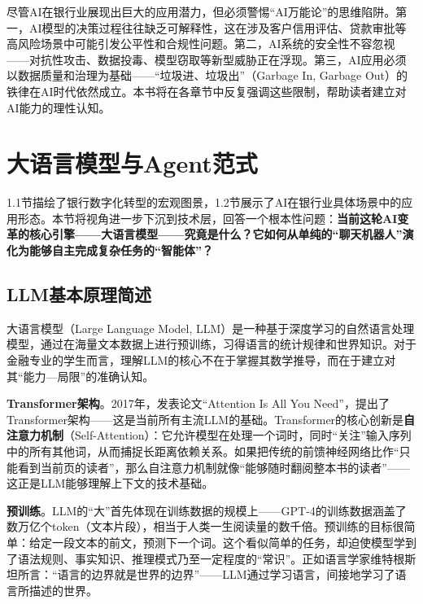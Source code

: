 \begin{warningbox}[警惕“AI万能论”]
尽管AI在银行业展现出巨大的应用潜力，但必须警惕``AI万能论''的思维陷阱。第一，AI模型的决策过程往往缺乏可解释性，这在涉及客户信用评估、贷款审批等高风险场景中可能引发公平性和合规性问题。第二，AI系统的安全性不容忽视——对抗性攻击、数据投毒、模型窃取等新型威胁正在浮现。第三，AI应用必须以数据质量和治理为基础——``垃圾进、垃圾出''（Garbage In, Garbage Out）的铁律在AI时代依然成立。本书将在各章节中反复强调这些限制，帮助读者建立对AI能力的理性认知。
\end{warningbox}


\section{大语言模型与Agent范式}

1.1节描绘了银行数字化转型的宏观图景，1.2节展示了AI在银行业具体场景中的应用形态。本节将视角进一步下沉到技术层，回答一个根本性问题：\textbf{当前这轮AI变革的核心引擎——大语言模型——究竟是什么？它如何从单纯的``聊天机器人''演化为能够自主完成复杂任务的``智能体''？}

\subsection{LLM基本原理简述}

大语言模型（Large Language Model, LLM）是一种基于深度学习的自然语言处理模型，通过在海量文本数据上进行预训练，习得语言的统计规律和世界知识。对于金融专业的学生而言，理解LLM的核心不在于掌握其数学推导，而在于建立对其``能力—局限''的准确认知。

\textbf{Transformer架构}。2017年，\textcite{vaswani2017attention}发表论文``Attention Is All You Need''，提出了Transformer架构——这是当前所有主流LLM的基础。Transformer的核心创新是\textbf{自注意力机制}（Self-Attention）：它允许模型在处理一个词时，同时``关注''输入序列中的所有其他词，从而捕捉长距离依赖关系。如果把传统的前馈神经网络比作``只能看到当前页的读者''，那么自注意力机制就像``能够随时翻阅整本书的读者''——这正是LLM能够理解上下文的技术基础。

\textbf{预训练}。LLM的``大''首先体现在训练数据的规模上——GPT-4的训练数据涵盖了数万亿个token（文本片段），相当于人类一生阅读量的数千倍。预训练的目标很简单：给定一段文本的前文，预测下一个词。这个看似简单的任务，却迫使模型学到了语法规则、事实知识、推理模式乃至一定程度的``常识''。正如语言学家维特根斯坦所言：``语言的边界就是世界的边界''——LLM通过学习语言，间接地学习了语言所描述的世界。

